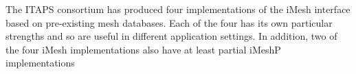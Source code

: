 \documentclass[letterpaper]{jpconf}
\begin{document}
%
%
%
%
%
The ITAPS consortium has produced four implementations of the iMesh
interface based on pre-existing mesh databases.  Each of the four has
its own particular strengths and so are useful in different
application settings.  In addition, two of the four iMesh
implementations also have at least partial iMeshP implementations
\end{document}
